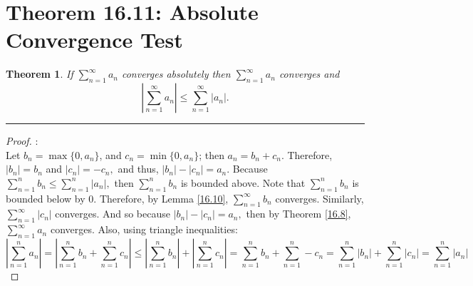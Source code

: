 \documentclass[openany, amssymb, psamsfonts]{amsart}
\newcommand{\abs}[1]{\lvert #1 \rvert}
\newtheorem{thm}{Theorem}[section]
\theoremstyle{definition}
\numberwithin{equation}{section}
\begin{document}
\section*{Theorem 16.11: Absolute Convergence Test}
\begin{thm}
\label{16.11}
	If $\displaystyle \sum_{n=1}^\infty a_n$ converges absolutely then $\displaystyle \sum_{n=1}^\infty a_n$ converges and
	\[
		\left| \sum_{n=1}^\infty a_n \right| \leq \sum_{n=1}^\infty \abs{a_n}.
	\]
\end{thm}
\vspace{4pt}     \hrule   \vspace{4pt}\begin{proof}:\\
Let $b_n = \max\{0, a_n\}$, and $c_n = \min\{0, a_n\}$; then $a_n = b_n + c_n$. Therefore, $|b_n| = b_n$ and $|c_n| = -c_n,$ and thus, $|b_n| - |c_n| = a_n.$ Because $\displaystyle\sum_{n = 1}^nb_n \leq \displaystyle\sum_{n = 1}^n|a_n|,$ then $\displaystyle\sum _{n = 1}^nb_n$ is bounded above. Note that $\displaystyle\sum_{n = 1}^nb_n$ is bounded below by $0.$ Therefore, by Lemma \ref{16.10}, $\displaystyle\sum_{n = 1}^\infty b_n$ converges. Similarly, $\displaystyle\sum_{n =1}^\infty|c_n|$ converges. And so because $|b_n| - |c_n| = a_n,$ then by Theorem \ref{16.8}, $\displaystyle\sum_{n = 1}^\infty a_n$ converges. Also, using triangle inequalities:
\[\left|\displaystyle\sum_{n = 1}^na_n\right| = \left|\displaystyle\sum_{n = 1}^nb_n + \displaystyle\sum_{n = 1}^nc_n\right| \leq \left|\displaystyle\sum_{n = 1}^nb_n\right| + \left|\displaystyle\sum_{n = 1}^nc_n\right| = \displaystyle\sum_{n = 1}^nb_n + \displaystyle\sum_{n = 1}^n-c_n = \displaystyle\sum_{n = 1}^n|b_n| + \displaystyle\sum_{n = 1}^n|c_n| = \displaystyle\sum_{n = 1}^n|a_n|\]
\end{proof}
\end{document}
